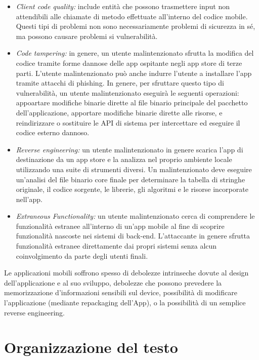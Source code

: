 \begin{itemize}
    \item \textit{Client code quality:} include entità che possono trasmettere input non attendibili alle chiamate di metodo effettuate all'interno del codice mobile. Questi tipi di problemi non sono necessariamente problemi di sicurezza in sé, ma possono causare problemi si vulnerabilità.
    \item \textit{Code tampering:}
    in genere, un utente malintenzionato sfrutta la modifica del codice tramite forme dannose delle app ospitante negli app store di terze parti.
    L'utente malintenzionato può anche indurre l'utente a installare l'app tramite attacchi di phishing. In genere, per sfruttare questo tipo di vulnerabilità, un utente malintenzionato eseguirà le seguenti operazioni: appoartare modifiche binarie dirette al file binario principale del pacchetto dell'applicazione, apportare modifiche binarie dirette alle risorse, e reindirizzare o sostituire le API di sistema per intercettare ed eseguire il codice esterno dannoso.

    \item \textit{Reverse engineering:}
    un utente malintenzionato in genere scarica l'app di destinazione da un app store e la analizza nel proprio ambiente locale utilizzando una suite di strumenti diversi. Un malintenzionato deve eseguire un'analisi del file binario core finale per determinare la tabella di stringhe originale, il codice sorgente, le librerie, gli algoritmi e le risorse incorporate nell'app.
    \item \textit{Extraneous Functionality:}
    un utente malintenzionato cerca di comprendere le funzionalità estranee all'interno di un'app mobile  al fine di scoprire funzionalità nascoste nei sistemi di back-end.
    L'attaccante in genere sfrutta funzionalità estranee direttamente dai propri sistemi senza alcun coinvolgimento da parte degli utenti finali.
\end{itemize}
Le applicazioni mobili soffrono spesso di debolezze intrinseche dovute al design dell'applicazione e al suo sviluppo, debolezze che possono prevedere la memorizzazione d'informazioni sensibili sul device, possibilità di modificare l'applicazione (mediante \gls{repackaging} dell'App), o la possibilità di un semplice reverse engineering.

\section{Organizzazione del testo}\label{sec:organizzazione-del-testo}


